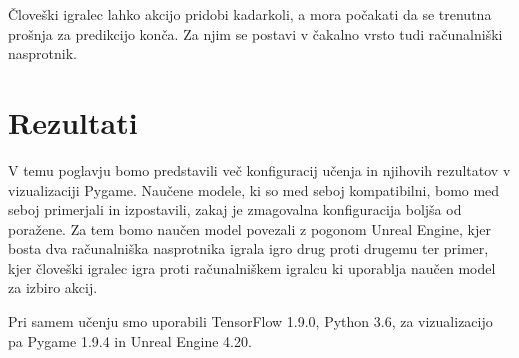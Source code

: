 \documentclass[a4paper, 12pt]{book}
\begin{document}
Človeški igralec lahko akcijo pridobi kadarkoli, a mora počakati da se trenutna prošnja za predikcijo konča. Za njim se postavi v čakalno vrsto tudi računalniški nasprotnik.

\chapter{Rezultati}
\label{chrezultati}

V temu poglavju bomo predstavili več konfiguracij učenja in njihovih rezultatov v vizualizaciji Pygame.
Naučene modele, ki so med seboj kompatibilni, bomo med seboj primerjali in izpostavili, zakaj je zmagovalna konfiguracija boljša od poražene.
Za tem bomo naučen model povezali z pogonom Unreal Engine, kjer bosta dva računalniška nasprotnika igrala igro drug proti drugemu ter primer, kjer človeški igralec igra proti računalniškem igralcu ki uporablja naučen model za izbiro akcij.

Pri samem učenju smo uporabili  TensorFlow 1.9.0, Python 3.6, za vizualizacijo pa  Pygame 1.9.4 in Unreal Engine 4.20.
\end{document}
